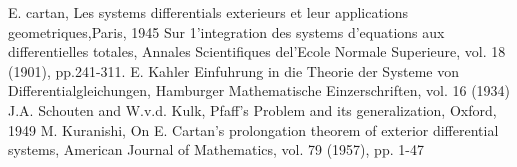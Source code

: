 \begin{thebibliography}{99}\pageoriginale
{} {E. cartan, Les} systems differentials exterieurs et leur
  applications geometriques,Paris, 1945 
 Sur 1'integration des systems d'equations aux
  differentielles totales, Annales Scientifiques del'Ecole Normale
  Superieure, vol. 18 (1901), pp.241-311. 
 {E. Kahler} Einfuhrung in die Theorie der Systeme von
  Differentialgleichungen, Hamburger Mathematische Einzerschriften,
  vol. 16 (1934) 
 {J.A. Schouten and W.v.d. Kulk}, Pfaff's Problem and its
  generalization, Oxford, 1949 
 {M. Kuranishi,} On E. Cartan's prolongation theorem of
  exterior differential systems, American Journal of Mathematics,
  vol. 79 (1957), pp. 1-47 
\end{thebibliography} 
